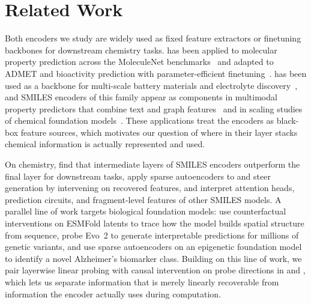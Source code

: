 \section{Related Work}

Both encoders we study are widely used as fixed feature extractors or finetuning backbones for downstream chemistry tasks. \molm has been applied to molecular property prediction across the MoleculeNet benchmarks~\citep{ross2022largescalechemicallanguagerepresentations,wu2018moleculenet} and adapted to ADMET and bioactivity prediction with parameter-efficient finetuning~\citep{harod2025effichem}. \smi has been used as a backbone for multi-scale battery materials and electrolyte discovery~\citep{sharma2025foundation}, and SMILES encoders of this family appear as components in multimodal property predictors that combine text and graph features~\citep{rollins2024molprop} and in scaling studies of chemical foundation models~\citep{cai2026chemfm}. These applications treat the encoders as black-box feature sources, which motivates our question of where in their layer stacks chemical information is actually represented and used.

On chemistry, \citet{pinto2025superior} find that intermediate layers of SMILES encoders outperform the final layer for downstream tasks, \citet{cohen2025unveiling} apply sparse autoencoders to \smi and steer generation by intervening on recovered features, and \citet{varadi2025circuits,muller2025uncovering,hu2024empirical} interpret attention heads, prediction circuits, and fragment-level features of other SMILES models. A parallel line of work targets biological foundation models: \citet{lu2026mechanisms} use counterfactual interventions on ESMFold latents to trace how the model builds spatial structure from sequence, \citet{goodfire2026evee} probe Evo~2 to generate interpretable predictions for millions of genetic variants, and \citet{goodfire2026alzheimers} use sparse autoencoders on an epigenetic foundation model to identify a novel Alzheimer's biomarker class. Building on this line of work, we pair layerwise linear probing with causal intervention on probe directions in \molm and \smi, which lets us separate information that is merely linearly recoverable from information the encoder actually uses during computation.
